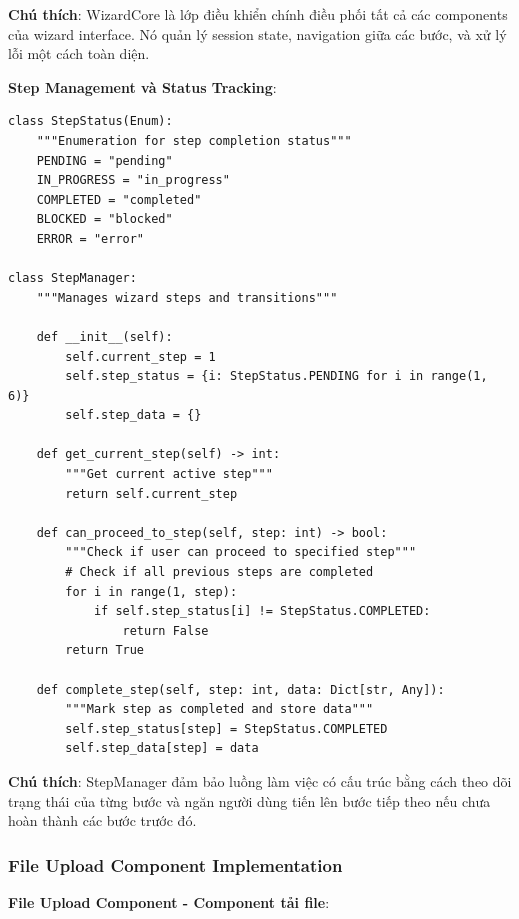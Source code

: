 \textbf{Chú thích}: WizardCore là lớp điều khiển chính điều phối tất cả các components của wizard interface. Nó quản lý session state, navigation giữa các bước, và xử lý lỗi một cách toàn diện.

\textbf{Step Management và Status Tracking}:

\begin{verbatim}
class StepStatus(Enum):
    """Enumeration for step completion status"""
    PENDING = "pending"
    IN_PROGRESS = "in_progress" 
    COMPLETED = "completed"
    BLOCKED = "blocked"
    ERROR = "error"

class StepManager:
    """Manages wizard steps and transitions"""
    
    def __init__(self):
        self.current_step = 1
        self.step_status = {i: StepStatus.PENDING for i in range(1, 6)}
        self.step_data = {}
        
    def get_current_step(self) -> int:
        """Get current active step"""
        return self.current_step
        
    def can_proceed_to_step(self, step: int) -> bool:
        """Check if user can proceed to specified step"""
        # Check if all previous steps are completed
        for i in range(1, step):
            if self.step_status[i] != StepStatus.COMPLETED:
                return False
        return True
        
    def complete_step(self, step: int, data: Dict[str, Any]):
        """Mark step as completed and store data"""
        self.step_status[step] = StepStatus.COMPLETED
        self.step_data[step] = data
\end{verbatim}

\textbf{Chú thích}: StepManager đảm bảo luồng làm việc có cấu trúc bằng cách theo dõi trạng thái của từng bước và ngăn người dùng tiến lên bước tiếp theo nếu chưa hoàn thành các bước trước đó.

\subsubsection{File Upload Component Implementation}

\textbf{File Upload Component - Component tải file}:

